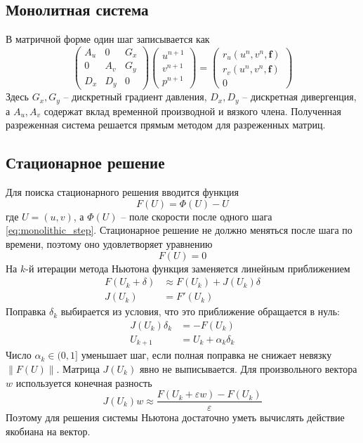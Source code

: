 \documentclass[12pt,a4paper]{article}
\newcommand{\norm}[1]{\left\lVert #1 \right\rVert}
\begin{document}
\subsection{Монолитная система}

В матричной форме один шаг записывается как
\[
    \begin{pmatrix}
        A_u & 0 & G_x\\
        0 & A_v & G_y\\
        D_x & D_y & 0
    \end{pmatrix}
    \begin{pmatrix}
        u^{n+1}\\
        v^{n+1}\\
        p^{n+1}
    \end{pmatrix}
    =
    \begin{pmatrix}
        r_u(u^n,v^n,\mathbf{f})\\
        r_v(u^n,v^n,\mathbf{f})\\
        0
    \end{pmatrix}
    \label{eq:monolithic_step}
\]
Здесь \(G_x,G_y\) -- дискретный градиент давления, \(D_x,D_y\) -- дискретная
дивергенция, а \(A_u,A_v\) содержат вклад временной производной и вязкого
члена. Полученная разреженная система решается прямым методом для разреженных
матриц.

\subsection{Стационарное решение}

Для поиска стационарного решения вводится функция
\[
    F(U)=\Phi(U)-U
\]
где \(U=(u,v)\), а \(\Phi(U)\) -- поле скорости после одного шага
\eqref{eq:monolithic_step}. Стационарное решение не должно меняться после
шага по времени, поэтому оно удовлетворяет уравнению
\[
    F(U)=0
\]
На \(k\)-й итерации метода Ньютона функция заменяется линейным приближением
\[
    \begin{aligned}
    F(U_k+\delta)&\approx F(U_k)+J(U_k)\delta\\
    J(U_k)&=F'(U_k)
    \end{aligned}
\]
Поправка \(\delta_k\) выбирается из условия, что это приближение обращается в
нуль:
\[
    \begin{aligned}
    J(U_k)\delta_k&=-F(U_k)\\
    U_{k+1}&=U_k+\alpha_k\delta_k
    \end{aligned}
\]
Число \(\alpha_k\in(0,1]\) уменьшает шаг, если полная поправка не снижает
невязку \(\norm{F(U)}\). Матрица \(J(U_k)\) явно не выписывается. Для
произвольного вектора \(w\) используется конечная разность
\[
    J(U_k)w\approx
    \frac{F(U_k+\varepsilon w)-F(U_k)}
    {\varepsilon}
\]
Поэтому для решения системы Ньютона достаточно уметь вычислять действие
якобиана на вектор.
\end{document}
